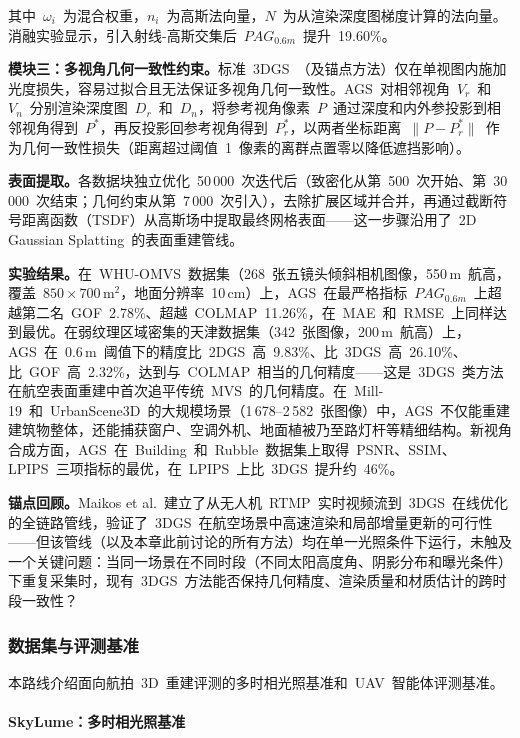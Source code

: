 其中~$\omega_i$~为混合权重，$n_i$~为高斯法向量，$N$~为从渲染深度图梯度计算的法向量。消融实验显示，引入射线-高斯交集后~$PAG_{0.6m}$~提升~19.60\%。

\textbf{模块三：多视角几何一致性约束。}标准~3DGS~（及锚点方法）仅在单视图内施加光度损失，容易过拟合且无法保证多视角几何一致性。AGS~对相邻视角~$V_r$~和~$V_n$~分别渲染深度图~$D_r$~和~$D_n$，将参考视角像素~$P$~通过深度和内外参投影到相邻视角得到~$P^*$，再反投影回参考视角得到~$P_r^*$，以两者坐标距离~$\|P - P_r^*\|$~作为几何一致性损失（距离超过阈值~1~像素的离群点置零以降低遮挡影响）。

\textbf{表面提取。}各数据块独立优化~50\,000~次迭代后（致密化从第~500~次开始、第~30\,000~次结束；几何约束从第~7\,000~次引入），去除扩展区域并合并，再通过截断符号距离函数（TSDF）从高斯场中提取最终网格表面——这一步骤沿用了~2D Gaussian Splatting~的表面重建管线。

\textbf{实验结果。}在~WHU-OMVS~数据集（268~张五镜头倾斜相机图像，550\,m~航高，覆盖~$850\times700$\,m$^2$，地面分辨率~10\,cm）上，AGS~在最严格指标~$PAG_{0.6m}$~上超越第二名~GOF~2.78\%、超越~COLMAP~11.26\%，在~MAE~和~RMSE~上同样达到最优。在弱纹理区域密集的天津数据集（342~张图像，200\,m~航高）上，AGS~在~0.6\,m~阈值下的精度比~2DGS~高~9.83\%、比~3DGS~高~26.10\%、比~GOF~高~2.32\%，达到与~COLMAP~相当的几何精度——这是~3DGS~类方法在航空表面重建中首次追平传统~MVS~的几何精度。在~Mill-19~和~UrbanScene3D~的大规模场景（1\,678--2\,582~张图像）中，AGS~不仅能重建建筑物整体，还能捕获窗户、空调外机、地面植被乃至路灯杆等精细结构。新视角合成方面，AGS~在~Building~和~Rubble~数据集上取得~PSNR、SSIM、LPIPS~三项指标的最优，在~LPIPS~上比~3DGS~提升约~46\%。

\textbf{锚点回顾。}Maikos et al.~建立了从无人机~RTMP~实时视频流到~3DGS~在线优化的全链路管线，验证了~3DGS~在航空场景中高速渲染和局部增量更新的可行性——但该管线（以及本章此前讨论的所有方法）均在单一光照条件下运行，未触及一个关键问题：当同一场景在不同时段（不同太阳高度角、阴影分布和曝光条件）下重复采集时，现有~3DGS~方法能否保持几何精度、渲染质量和材质估计的跨时段一致性？

\subsubsection{数据集与评测基准}

本路线介绍面向航拍~3D~重建评测的多时相光照基准和~UAV~智能体评测基准。

\paragraph{SkyLume：多时相光照基准}


